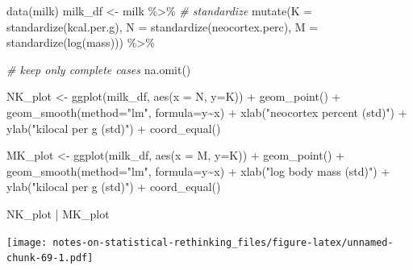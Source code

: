 \documentclass[
]{book}
\newenvironment{Shaded}{\begin{snugshade}}{\end{snugshade}}
\newcommand{\AttributeTok}[1]{\textcolor[rgb]{0.77,0.63,0.00}{#1}}
\newcommand{\CommentTok}[1]{\textcolor[rgb]{0.56,0.35,0.01}{\textit{#1}}}
\newcommand{\FunctionTok}[1]{\textcolor[rgb]{0.00,0.00,0.00}{#1}}
\newcommand{\NormalTok}[1]{#1}
\newcommand{\OtherTok}[1]{\textcolor[rgb]{0.56,0.35,0.01}{#1}}
\newcommand{\SpecialCharTok}[1]{\textcolor[rgb]{0.00,0.00,0.00}{#1}}
\newcommand{\StringTok}[1]{\textcolor[rgb]{0.31,0.60,0.02}{#1}}
\begin{document}
\begin{Shaded}
\begin{Highlighting}[]
\FunctionTok{data}\NormalTok{(milk)}
\NormalTok{milk\_df }\OtherTok{\textless{}{-}} 
\NormalTok{  milk }\SpecialCharTok{\%\textgreater{}\%}
  \CommentTok{\# standardize}
  \FunctionTok{mutate}\NormalTok{(}\AttributeTok{K =} \FunctionTok{standardize}\NormalTok{(kcal.per.g),}
         \AttributeTok{N =} \FunctionTok{standardize}\NormalTok{(neocortex.perc),}
         \AttributeTok{M =} \FunctionTok{standardize}\NormalTok{(}\FunctionTok{log}\NormalTok{(mass))) }\SpecialCharTok{\%\textgreater{}\%}
  
  \CommentTok{\# keep only complete cases}
  \FunctionTok{na.omit}\NormalTok{()}

\NormalTok{NK\_plot }\OtherTok{\textless{}{-}} 
  \FunctionTok{ggplot}\NormalTok{(milk\_df, }\FunctionTok{aes}\NormalTok{(}\AttributeTok{x =}\NormalTok{ N, }\AttributeTok{y=}\NormalTok{K)) }\SpecialCharTok{+} 
  \FunctionTok{geom\_point}\NormalTok{() }\SpecialCharTok{+} 
  \FunctionTok{geom\_smooth}\NormalTok{(}\AttributeTok{method=}\StringTok{"lm"}\NormalTok{, }\AttributeTok{formula=}\NormalTok{y}\SpecialCharTok{\textasciitilde{}}\NormalTok{x) }\SpecialCharTok{+} 
  \FunctionTok{xlab}\NormalTok{(}\StringTok{"neocortex percent (std)"}\NormalTok{) }\SpecialCharTok{+} 
  \FunctionTok{ylab}\NormalTok{(}\StringTok{"kilocal per g (std)"}\NormalTok{) }\SpecialCharTok{+} 
  \FunctionTok{coord\_equal}\NormalTok{()}

\NormalTok{MK\_plot }\OtherTok{\textless{}{-}} 
  \FunctionTok{ggplot}\NormalTok{(milk\_df, }\FunctionTok{aes}\NormalTok{(}\AttributeTok{x =}\NormalTok{ M, }\AttributeTok{y=}\NormalTok{K)) }\SpecialCharTok{+} 
  \FunctionTok{geom\_point}\NormalTok{() }\SpecialCharTok{+} 
  \FunctionTok{geom\_smooth}\NormalTok{(}\AttributeTok{method=}\StringTok{"lm"}\NormalTok{, }\AttributeTok{formula=}\NormalTok{y}\SpecialCharTok{\textasciitilde{}}\NormalTok{x) }\SpecialCharTok{+} 
  \FunctionTok{xlab}\NormalTok{(}\StringTok{"log body mass (std)"}\NormalTok{) }\SpecialCharTok{+} 
  \FunctionTok{ylab}\NormalTok{(}\StringTok{"kilocal per g (std)"}\NormalTok{) }\SpecialCharTok{+} 
  \FunctionTok{coord\_equal}\NormalTok{()}

\NormalTok{NK\_plot }\SpecialCharTok{|}\NormalTok{ MK\_plot}
\end{Highlighting}
\end{Shaded}

\texttt{[image: notes-on-statistical-rethinking\_files/figure-latex/unnamed-chunk-69-1.pdf]}
\end{document}
